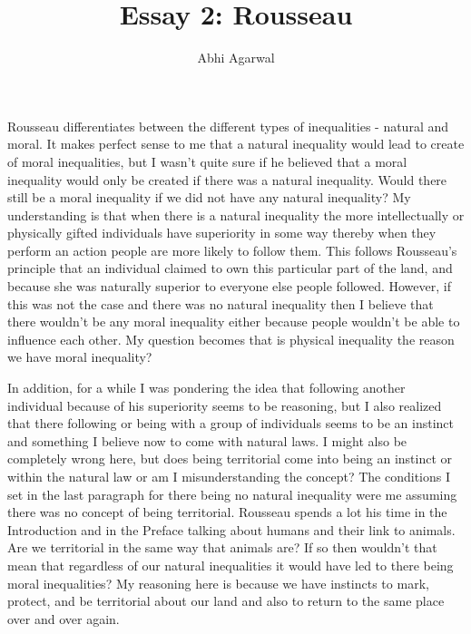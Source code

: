 \documentclass[11pt, oneside]{article}
\title{Essay 2: Rousseau}
\author{Abhi Agarwal}
\date{}
\begin{document}
\maketitle

\par Rousseau differentiates between the different types of inequalities - natural and moral. It makes perfect sense to me that a natural inequality would lead to create of moral inequalities, but I wasn't quite sure if he believed that a moral inequality would only be created if there was a natural inequality. Would there still be a moral inequality if we did not have any natural inequality? My understanding is that when there is a natural inequality the more intellectually or physically gifted individuals have superiority in some way thereby when they perform an action people are more likely to follow them. This follows Rousseau's principle that an individual claimed to own this particular part of the land, and because she was naturally superior to everyone else people followed. However, if this was not the case and there was no natural inequality then I believe that there wouldn't be any moral inequality either because people wouldn't be able to influence each other. My question becomes that is physical inequality the reason we have moral inequality? 

\par In addition, for a while I was pondering the idea that following another individual because of his superiority seems to be reasoning, but I also realized that there following or being with a group of individuals seems to be an instinct and something I believe now to come with natural laws. I might also be completely wrong here, but does being territorial come into being an instinct or within the natural law or am I misunderstanding the concept? The conditions I set in the last paragraph for there being no natural inequality were me assuming there was no concept of being territorial. Rousseau spends a lot his time in the Introduction and in the Preface talking about humans and their link to animals. Are we territorial in the same way that animals are? If so then wouldn't that mean that regardless of our natural inequalities it would have led to there being moral inequalities? My reasoning here is because we have instincts to mark, protect, and be territorial about our land and also to return to the same place over and over again. 
\end{document}
